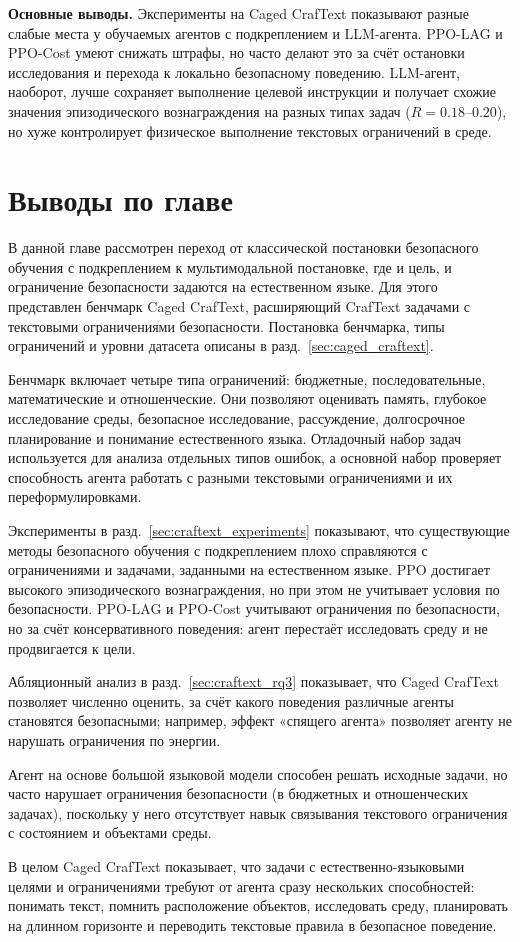\textbf{Основные выводы.} Эксперименты на Caged CrafText показывают разные слабые места у обучаемых агентов с подкреплением и LLM-агента. PPO-LAG и PPO-Cost умеют снижать штрафы, но часто делают это за счёт остановки исследования и перехода к локально безопасному поведению. LLM-агент, наоборот, лучше сохраняет выполнение целевой инструкции и получает схожие значения эпизодического вознаграждения на разных типах задач ($R = 0.18$--$0.20$), но хуже контролирует физическое выполнение текстовых ограничений в среде.


\section{Выводы по главе}
\label{sec:chapter5_conclusion}

В данной главе рассмотрен переход от классической постановки безопасного обучения с подкреплением к мультимодальной постановке, где и цель, и ограничение безопасности задаются на естественном языке. Для этого представлен бенчмарк Caged CrafText, расширяющий CrafText задачами с текстовыми ограничениями безопасности. Постановка бенчмарка, типы ограничений и уровни датасета описаны в разд.~\ref{sec:caged_craftext}.

Бенчмарк включает четыре типа ограничений: бюджетные, последовательные, математические и отношенческие. Они позволяют оценивать память, глубокое исследование среды, безопасное исследование, рассуждение, долгосрочное планирование и понимание естественного языка. Отладочный набор задач используется для анализа отдельных типов ошибок, а основной набор проверяет способность агента работать с разными текстовыми ограничениями и их переформулировками.

Эксперименты в разд.~\ref{sec:craftext_experiments} показывают, что существующие методы безопасного обучения с подкреплением плохо справляются с ограничениями и задачами, заданными на естественном языке. PPO достигает высокого эпизодического вознаграждения, но при этом не учитывает условия по безопасности. PPO-LAG и PPO-Cost учитывают ограничения по безопасности, но за счёт консервативного поведения: агент перестаёт исследовать среду и не продвигается к цели.

Абляционный анализ в разд.~\ref{sec:craftext_rq3} показывает, что Caged CrafText позволяет численно оценить, за счёт какого поведения различные агенты становятся безопасными; например, эффект «спящего агента» позволяет агенту не нарушать ограничения по энергии.

Агент на основе большой языковой модели способен решать исходные задачи, но часто нарушает ограничения безопасности (в бюджетных и отношенческих задачах), поскольку у него отсутствует навык связывания текстового ограничения с состоянием и объектами среды.

В целом Caged CrafText показывает, что задачи с естественно-языковыми целями и ограничениями требуют от агента сразу нескольких способностей: понимать текст, помнить расположение объектов, исследовать среду, планировать на длинном горизонте и переводить текстовые правила в безопасное поведение.